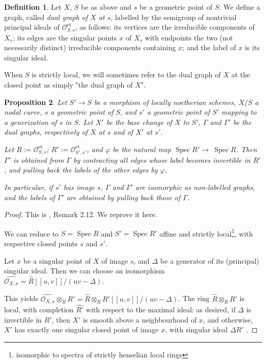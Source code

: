 \documentclass[a4paper,12pt]{amsart} %
\numberwithin{equation}{subsection}
\newcommand{\on}[1]{\operatorname{#1}}
\newcommand{\Spec}{\operatorname{Spec}}
\theoremstyle{definition}
\newtheorem{definition}{Definition}[section]
\theoremstyle{plain}%
\newtheorem{proposition}[definition]{Proposition}
\theoremstyle{remark}
\renewcommand{\phi}{\varphi}
\renewcommand{\O}{\mathcal{O}}
\begin{document}
\begin{definition}\label{definition:dual_graph}
	Let $X$, $S$ be as above and $s$ be a geometric point of $S$. We define a graph, called \emph{dual graph of $X$ at $s$}, labelled by the semigroup of nontrivial principal ideals of $\O^{\on{et}}_{S,s}$, as follows: its vertices are the irreducible components of $X_s$; its edges are the singular points $x$ of $X_s$ with endpoints the two (not necessarily distinct) irreducible components containing $x$; and the label of $x$ is its singular ideal.
	
When $S$ is strictly local, we will sometimes refer to the dual graph of $X$ at the closed point as simply "the dual graph of $X$".
\end{definition}


\begin{proposition}\label{graphes duaux et changement de base}
	Let $S'\to S$ be a morphism of locally noetherian schemes, $X/S$ a nodal curve, $s$ a geometric point of $S$, and $s'$ a geometric point of $S'$ mapping to a generization of $s$ in $S$. Let $X'$ be the base change of $X$ to $S'$, $\Gamma$ and $\Gamma'$ be the dual graphs, respectively of $X$ at $s$ and of $X'$ at $s'$.
	
	Let $R:=\O^{\on{et}}_{S,s}$; $R':=\O^{\on{et}}_{S',s'}$, and $\phi$ be the natural map $\Spec R'\to~\Spec R$. Then $\Gamma'$ is obtained from $\Gamma$ by contracting all edges whose label becomes invertible in $R'$, and pulling back the labels of the other edges by $\phi$.
	
	In particular, if $s'$ has image $s$, $\Gamma$ and $\Gamma'$ are isomorphic as non-labelled graphs, and the labels of $\Gamma'$ are obtained by pulling back those of $\Gamma$.
\end{proposition}

\begin{proof}
	This is \cite{Holmes}, Remark 2.12. We reprove it here.
	
	We can reduce to $S=\Spec R$ and $S'=\Spec R'$ affine and strictly local\footnote{isomorphic to spectra of strictly henselian local rings}, with respective closed points $s$ and $s'$.
	
	Let $x$ be a singular point of $X$ of image $s$, and $\Delta$ be a generator of its (principal) singular ideal. Then we can choose an isomorphism $\widehat{\O_{X,x}}=\widehat{R}[[u,v]]/(uv-\Delta)$.

	This yields $\widehat{\O_{X,x}}\otimes_R R'=\widehat{R}\otimes_R R'[[u,v]]/(uv-\Delta)$. The ring $\widehat{R}\otimes_R R'$ is local, with completion $\widehat{R'}$ with respect to the maximal ideal: as desired, if $\Delta$ is invertible in $R'$, then $X'$ is smooth above a neighbourhood of $x$, and otherwise, $X'$ has exactly one singular closed point of image $x$, with singular ideal $\Delta R'$ .
\end{proof}
\end{document}
